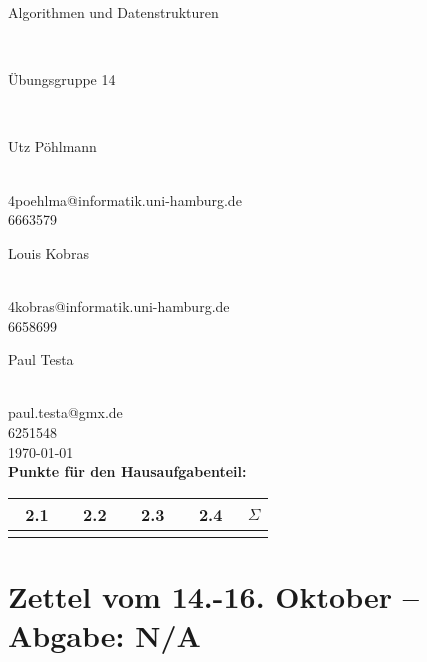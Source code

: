 \documentclass{article}
\begin{document}
\thispagestyle{empty}
\-\vspace{2cm}
\begin{center}
\begin{Huge}
Algorithmen und Datenstrukturen
\end{Huge}\\
\vspace{2cm}
\begin{LARGE}
Übungsgruppe 14
\end{LARGE}\\
\vspace{2cm}
\begin{Large}
Utz Pöhlmann
\end{Large}\\
4poehlma@informatik.uni-hamburg.de\\
6663579\\
\vspace{1cm}
\begin{Large}
Louis Kobras
\end{Large}\\
4kobras@informatik.uni-hamburg.de\\
6658699\\
\vspace{1cm}
\begin{Large}
Paul Testa
\end{Large}\\
paul.testa@gmx.de\\
6251548\\
\vspace{2.5cm}
\today\\
\vspace{2.5cm}
\textbf{Punkte für den Hausaufgabenteil:}\\
\vspace{1cm}
\begin{tabular}{c|c|c|c|c}
~2.1~&~2.2~&~2.3~&~2.4~&$\Sigma$	\\	\hline
&&&&

\end{tabular}
\end{center}
\newpage
\section{Zettel vom 14.-16. Oktober -- Abgabe: N/A}
\end{document}
